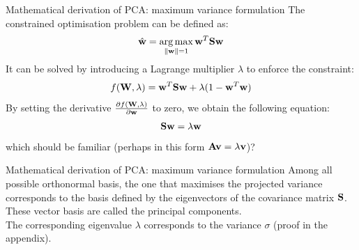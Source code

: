\documentclass[aspectratio=169,notes]{beamer}
\begin{document}
	\begin{frame}{Mathematical derivation of PCA: maximum variance formulation}
	The constrained optimisation problem can be defined as:
	\[
		\hat{{\bf w}} = \operatorname*{arg\,max}_{\|{\bf w}\|=1} {\bf w}^T {\bf S} {\bf w}
	\]
	It can be solved by introducing a Lagrange multiplier $\lambda$ to enforce the constraint:
	\[
		f({\bf W},\lambda) = {\bf w}^T {\bf S} {\bf w} + \lambda (1-{\bf w}^T{\bf w})
	\]
	By setting the derivative $\frac{\partial f({\bf W},\lambda)}{\partial {\bf w}}$ to zero, we obtain the following equation:
	\[
		{\bf S} {\bf w} = \lambda {\bf w}
	\]
	which should be familiar (perhaps in this form ${\bf A} {\bf v} = \lambda {\bf v}$)?
	\end{frame}

	\begin{frame}{Mathematical derivation of PCA: maximum variance formulation}
	Among all possible orthonormal basis, the one that maximises the projected variance corresponds to the basis defined by the eigenvectors of the covariance matrix ${\bf S}$. These vector basis are called the principal components.\\
	\leavevmode\newline
	The corresponding eigenvalue $\lambda$ corresponds to the variance $\sigma$ (proof in the appendix).
	\end{frame}


\end{document}
